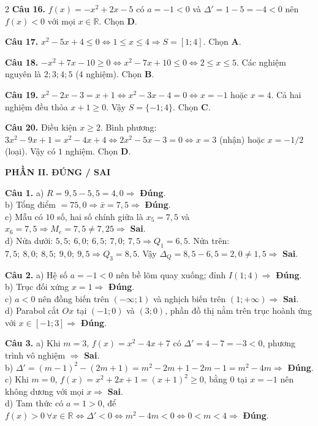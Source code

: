 \documentclass[10pt,a4paper]{article}
\begin{document}
\begin{multicols}{2}
\textbf{Câu 16.} $f(x) = -x^2 + 2x - 5$ có $a = -1 < 0$ và $\Delta' = 1 - 5 = -4 < 0$ nên $f(x) < 0$ với mọi $x \in \mathbb{R}$. Chọn \textbf{D}.

\textbf{Câu 17.} $x^2 - 5x + 4 \le 0 \Leftrightarrow 1 \le x \le 4 \Rightarrow S = [1; 4]$. Chọn \textbf{A}.

\textbf{Câu 18.} $-x^2 + 7x - 10 \ge 0 \Leftrightarrow x^2 - 7x + 10 \le 0 \Leftrightarrow 2 \le x \le 5$. Các nghiệm nguyên là $2; 3; 4; 5$ ($4$ nghiệm). Chọn \textbf{B}.

\textbf{Câu 19.} $x^2 - 2x - 3 = x + 1 \Leftrightarrow x^2 - 3x - 4 = 0 \Leftrightarrow x = -1$ hoặc $x = 4$. Cả hai nghiệm đều thỏa $x + 1 \ge 0$. Vậy $S = \{-1; 4\}$. Chọn \textbf{C}.

\textbf{Câu 20.} Điều kiện $x \ge 2$. Bình phương: $3x^2 - 9x + 1 = x^2 - 4x + 4 \Leftrightarrow 2x^2 - 5x - 3 = 0 \Leftrightarrow x = 3$ (nhận) hoặc $x = -1/2$ (loại). Vậy có $1$ nghiệm. Chọn \textbf{D}.

\columnbreak

\textbf{\color{accent}PHẦN II. ĐÚNG / SAI}

\textbf{Câu 1.}
a) $R = 9{,}5 - 5{,}5 = 4{,}0 \Rightarrow$ \textbf{Đúng}.\\
b) Tổng điểm $= 75{,}0 \Rightarrow \bar{x} = 7{,}5 \Rightarrow$ \textbf{Đúng}.\\
c) Mẫu có $10$ số, hai số chính giữa là $x_5 = 7{,}5$ và $x_6 = 7{,}5 \Rightarrow M_e = 7{,}5 \ne 7{,}25 \Rightarrow$ \textbf{Sai}.\\
d) Nửa dưới: $5{,}5;\ 6{,}0;\ 6{,}5;\ 7{,}0;\ 7{,}5 \Rightarrow Q_1 = 6{,}5$. Nửa trên: $7{,}5;\ 8{,}0;\ 8{,}5;\ 9{,}0;\ 9{,}5 \Rightarrow Q_3 = 8{,}5$. Vậy $\Delta_Q = 8{,}5 - 6{,}5 = 2{,}0 \ne 1{,}5 \Rightarrow$ \textbf{Sai}.

\textbf{Câu 2.}
a) Hệ số $a = -1 < 0$ nên bề lõm quay xuống; đỉnh $I(1; 4) \Rightarrow$ \textbf{Đúng}.\\
b) Trục đối xứng $x = 1 \Rightarrow$ \textbf{Đúng}.\\
c) $a < 0$ nên đồng biến trên $(-\infty; 1)$ và nghịch biến trên $(1; +\infty) \Rightarrow$ \textbf{Sai}.\\
d) Parabol cắt $Ox$ tại $(-1; 0)$ và $(3; 0)$, phần đồ thị nằm trên trục hoành ứng với $x \in [-1; 3] \Rightarrow$ \textbf{Đúng}.

\textbf{Câu 3.}
a) Khi $m = 3$, $f(x) = x^2 - 4x + 7$ có $\Delta' = 4 - 7 = -3 < 0$, phương trình vô nghiệm $\Rightarrow$ \textbf{Sai}.\\
b) $\Delta' = (m - 1)^2 - (2m + 1) = m^2 - 2m + 1 - 2m - 1 = m^2 - 4m \Rightarrow$ \textbf{Đúng}.\\
c) Khi $m = 0$, $f(x) = x^2 + 2x + 1 = (x + 1)^2 \ge 0$, bằng $0$ tại $x = -1$ nên không dương với mọi $x \Rightarrow$ \textbf{Sai}.\\
d) Tam thức có $a = 1 > 0$, để $f(x) > 0\ \forall x \in \mathbb{R} \Leftrightarrow \Delta' < 0 \Leftrightarrow m^2 - 4m < 0 \Leftrightarrow 0 < m < 4 \Rightarrow$ \textbf{Đúng}.


\end{multicols}
\end{document}
